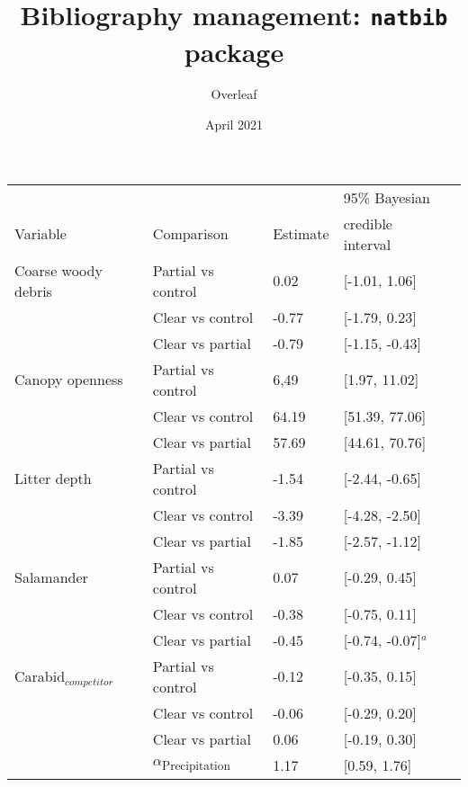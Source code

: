 \documentclass{article}
\title{Bibliography management: \texttt{natbib} package}
\author{Overleaf}
\date {April 2021}
\begin{document}
\begin{table}[ht]
    \centering
    \begin{tabular}{lllll} 
        \hline
        \rule{0pt}{3ex}
        &&&95\% Bayesian \\
        Variable & Comparison & Estimate &  credible interval \\ [0.5ex] 
        \hline
        Coarse woody debris & Partial vs control & \hspace{1mm}0.02 & [-1.01, 1.06] \\ 
                            & Clear vs control & -0.77 & [-1.79, 0.23] \\ 
                            & Clear vs partial & -0.79 & [-1.15, -0.43] \\
        Canopy openness     & Partial vs control & \hspace{1mm}6,49 & [1.97, 11.02] \\ 
                            & Clear vs control & \hspace{1mm}64.19 & [51.39, 77.06] \\ 
                            & Clear vs partial & \hspace{1mm}57.69 & [44.61, 70.76] \\ 
        Litter depth        & Partial vs control & -1.54 & [-2.44, -0.65] \\ 
                            & Clear vs control & -3.39 & [-4.28, -2.50] \\ 
                            & Clear vs partial & -1.85 & [-2.57, -1.12] \\       
        \hline
        Salamander          & Partial vs control & \hspace{1mm}0.07 & [-0.29, 0.45] \\ 
                            & Clear vs control & -0.38 & [-0.75, 0.11] \\ 
                            & Clear vs partial & -0.45 & [-0.74, -0.07]$^{a}$ \\       
        Carabid$_{competitor}$ & Partial vs control & -0.12 & [-0.35, 0.15] \\
                            & Clear vs control & -0.06 & [-0.29, 0.20] \\ 
                            & Clear vs partial & \hspace{1mm}0.06 & [-0.19, 0.30] \\ 
                            & $\alpha$\textsubscript{Precipitation} & \hspace{1mm}1.17 & [0.59, 1.76] \\

\end{tabular}
\end{table}
\end{document}
